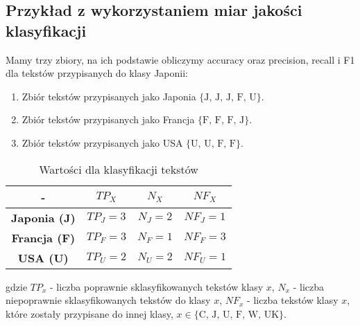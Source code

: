 \documentclass{article}
\begin{document}
\subsection{Przykład z wykorzystaniem miar jakości klasyfikacji}
Mamy trzy zbiory, na ich podstawie obliczymy accuracy oraz precision, recall i F1 dla tekstów przypisanych do klasy Japonii: 
\begin{enumerate}
    \item Zbiór tekstów przypisanych jako Japonia \( \{ \text{J, J, J, F, U} \} \).
    \item Zbiór tekstów przypisanych jako Francja \( \{ \text{F, F, F, J} \} \).
    \item Zbiór tekstów przypisanych jako USA \( \{ \text{U, U, F, F} \} \).
\end{enumerate}

\begin{table}[h!]
    \centering
    \begin{tabular}{|c|c|c|c|}
        \hline
        - & \textbf{\(TP_X\)} & \textbf{\(N_X\)} & \textbf{\(NF_X\)} \\
        \hline
        \textbf{Japonia (J)}  & \( TP_J = 3 \) & \( N_J = 2 \) & \( NF_J = 1 \) \\
        \hline
        \textbf{Francja (F)}  & \( TP_F = 3 \) & \( N_F = 1 \) & \( NF_F = 3 \) \\
        \hline
        \textbf{USA (U)}      & \( TP_U = 2 \) & \( N_U = 2 \) & \( NF_U = 1 \) \\
        \hline
    \end{tabular}
    \caption{Wartości dla klasyfikacji tekstów}
\end{table}



gdzie \(TP_x\) - liczba poprawnie sklasyfikowanych tekstów klasy \(x\), \(N_x\) - liczba niepoprawnie sklasyfikowanych  tekstów do klasy \(x\), \(NF_x\) - liczba tekstów klasy \(x\), które zostały przypisane do innej klasy, \(x \in \{ \text{C, J, U, F, W, UK} \}\).
\end{document}
